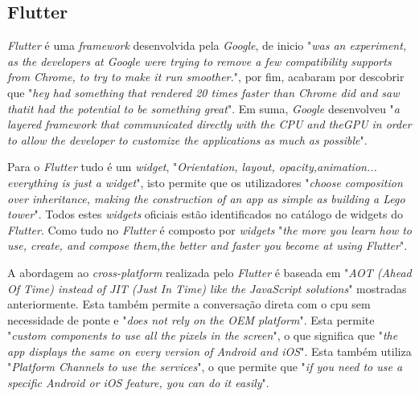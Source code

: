 \subsection{Flutter}
\textit{Flutter} é uma \textit{framework} desenvolvida pela \textit{Google}, de inicio "\emph{was an experiment, as the developers at Google were trying to remove a few compatibility supports from Chrome, to try to make it run smoother.}"\citep{flutter}, por fim, acabaram por descobrir que "\emph{hey had something that rendered 20 times faster than Chrome did and saw thatit had the potential to be something great}"\citep{flutter}. Em suma, \textit{Google} desenvolveu "\emph{a layered framework that communicated directly with the CPU and theGPU in order to allow the developer to customize the applications as much as possible}"\citep{flutter}.

Para o \textit{Flutter} tudo é um \textit{widget}, "\emph{Orientation, layout, opacity,animation... everything is just a widget}"\citep{flutter}, isto permite que os utilizadores "\emph{choose composition over inheritance, making the construction of an app as simple as building a Lego tower}"\citep{flutter}. Todos estes \textit{widgets} oficiais estão identificados no catálogo de widgets do \textit{Flutter}. Como tudo no \textit{Flutter} é composto por \textit{widgets} "\emph{the more you learn how to use, create, and compose them,the better and faster you become at using Flutter}"\citep{flutter}.

A abordagem ao \textit{cross-platform} realizada pelo \textit{Flutter} é baseada em  "\emph{AOT (Ahead Of Time) instead of JIT (Just In Time) like the JavaScript solutions}"\citep{flutter} mostradas anteriormente. Esta também permite a conversação direta com o cpu sem necessidade de ponte e "\emph{does not rely on the OEM platform}"\citep{flutter}. Esta permite "\emph{custom components to use all the pixels in the screen}"\citep{flutter}, o que significa que "\emph{the app displays the same on every version of Android and iOS}"\citep{flutter}. Esta também utiliza "\emph{Platform Channels to use the services}"\citep{flutter}, o que permite que "\emph{if you need to use a specific Android or iOS feature, you can do it easily}"\citep{flutter}.